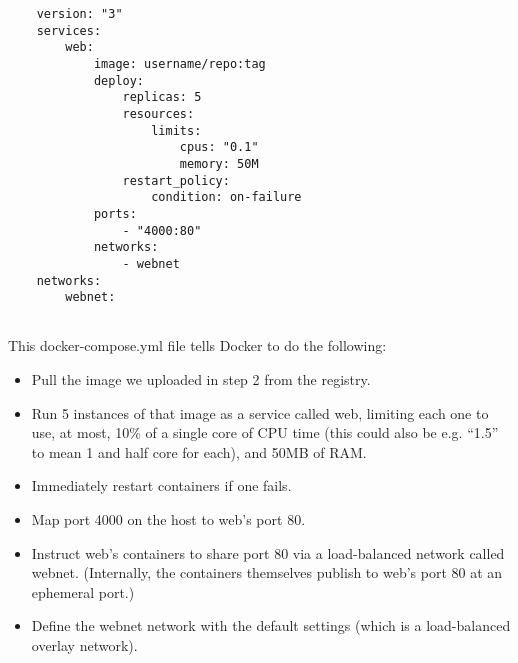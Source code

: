 \begin{lstlisting}
    version: "3"
    services: 
        web: 
            image: username/repo:tag
            deploy: 
                replicas: 5
                resources:
                    limits: 
                        cpus: "0.1"
                        memory: 50M
                restart_policy: 
                    condition: on-failure
            ports: 
                - "4000:80"
            networks: 
                - webnet
    networks: 
        webnet:
        
\end{lstlisting}

This docker-compose.yml file tells Docker to do the following:
\begin{itemize}
    \item Pull the image we uploaded in step 2 from the registry.
    \item Run 5 instances of that image as a service called web, limiting each one to use, at most, 10\% of a single core of CPU time (this could also be e.g. “1.5” to mean 1 and half core for each), and 50MB of RAM.
    \item Immediately restart containers if one fails.
    \item Map port 4000 on the host to web’s port 80.
    \item Instruct web’s containers to share port 80 via a load-balanced network called webnet. (Internally, the containers themselves publish to web’s port 80 at an ephemeral port.)
    \item Define the webnet network with the default settings (which is a load-balanced overlay network).
\end{itemize}





